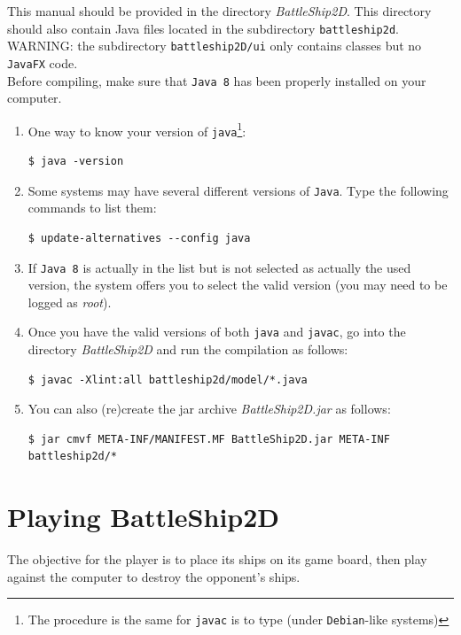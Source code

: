 \documentclass[twoside]{article}
\begin{document}
This manual should be provided in the directory \textit{BattleShip2D}. This directory should also contain Java files located in the subdirectory \texttt{battleship2d}. WARNING: the subdirectory \texttt{battleship2D/ui} only contains classes but no \texttt{JavaFX} code.\\

Before compiling, make sure that \texttt{Java~8} has been properly installed on your computer. 
\begin{enumerate}
\item One way to know your version of \texttt{java}\footnote{The procedure is the same for \texttt{javac} is to type (under \texttt{Debian}-like systems)}:
\begin{verbatim}
$ java -version
\end{verbatim}
\item Some systems may have several different versions of \texttt{Java}. Type the following commands to list them:
\begin{verbatim}
$ update-alternatives --config java
\end{verbatim}
\item If \texttt{Java~8} is actually in the list but is not selected as actually the used version, the system offers you to select the valid version (you may need to be logged as \textit{root}).
\item Once you have the valid versions of both \texttt{java} and \texttt{javac}, go into the directory \textit{BattleShip2D} and run the compilation as follows:
\begin{verbatim}
$ javac -Xlint:all battleship2d/model/*.java
\end{verbatim}

\item You can also (re)create the jar archive \textit{BattleShip2D.jar} as follows:
\begin{verbatim}
$ jar cmvf META-INF/MANIFEST.MF BattleShip2D.jar META-INF battleship2d/*
\end{verbatim}

\end{enumerate}

\section{Playing BattleShip2D}

The objective for the player is to place its ships on its game board, then play against the computer to destroy the opponent's ships.
\end{document}
